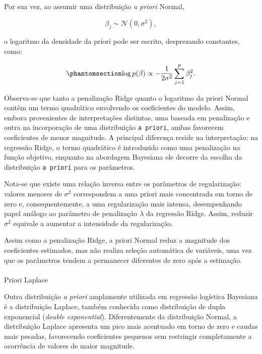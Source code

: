 \documentclass[
  brazilian,
  12pt,
  letterpaper,
  DIV=11,
  numbers=noendperiod]{scrartcl}
\makeatletter
\let\oldparagraph\paragraph
\renewcommand{\paragraph}{
    \@ifstar
      \xxxParagraphStar
      \xxxParagraphNoStar
  }
\newcommand{\xxxParagraphStar}[1]{\oldparagraph*{#1}\mbox{}}
\newcommand{\xxxParagraphNoStar}[1]{\oldparagraph{#1}\mbox{}}
\makeatother
\begin{document}
Por sua vez, ao assumir uma distribuição \emph{a priori} Normal,

\[
\beta_j
\sim
\mathcal{N}
(0,\sigma^2),
\]

o logaritmo da densidade da priori pode ser escrito, desprezando
constantes, como:

\begin{equation}\protect\phantomsection\label{eq-logprior-normal}{
\log p(\beta)
\propto
-
\frac{1}{2\sigma^2}
\sum_{j=1}^{p}
\beta_j^2.
}\end{equation}

Observa-se que tanto a penalização Ridge quanto o logaritmo da priori
Normal contêm um termo quadrático envolvendo os coeficientes do modelo.
Assim, embora provenientes de interpretações distintas, uma baseada em
penalização e outra na incorporação de uma distribuição
\texttt{a\ priori}, ambas favorecem coeficientes de menor magnitude. A
principal diferença reside na interpretação: na regressão Ridge, o termo
quadrático é introduzido como uma penalização na função objetivo,
enquanto na abordagem Bayesiana ele decorre da escolha da distribuição
\texttt{a\ priori} para os parâmetros.

Nota-se que existe uma relação inversa entre os parâmetros de
regularização: valores menores de \(\sigma^2\) correspondem a uma priori
mais concentrada em torno de zero e, consequentemente, a uma
regularização mais intensa, desempenhando papel análogo ao parâmetro de
penalização \(\lambda\) da regressão Ridge. Assim, reduzir \(\sigma^2\)
equivale a aumentar a intensidade da regularização.

Assim como a penalização Ridge, a priori Normal reduz a magnitude dos
coeficientes estimados, mas não realiza seleção automática de variáveis,
uma vez que os parâmetros tendem a permanecer diferentes de zero após a
estimação.

\paragraph{Priori Laplace}\label{priori-laplace}

Outra distribuição \emph{a priori} amplamente utilizada em regressão
logística Bayesiana é a distribuição Laplace, também conhecida como
distribuição de dupla exponencial (\emph{double exponential}).
Diferentemente da distribuição Normal, a distribuição Laplace apresenta
um pico mais acentuado em torno de zero e caudas mais pesadas,
favorecendo coeficientes pequenos sem restringir completamente a
ocorrência de valores de maior magnitude.
\end{document}
